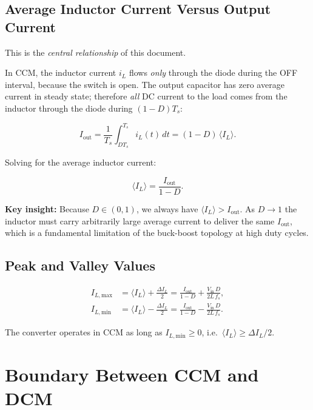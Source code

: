 \documentclass[12pt,a4paper]{article}
\newcommand{\Vin}{V_{\mathrm{in}}}
\newcommand{\Iout}{I_{\mathrm{out}}}
\newcommand{\ILmax}{I_{L,\mathrm{max}}}
\newcommand{\ILmin}{I_{L,\mathrm{min}}}
\newcommand{\ILavg}{\langle I_L \rangle}
\newcommand{\DeltaIL}{\Delta I_L}
\newcommand{\Ts}{T_s}
\newcommand{\fs}{f_s}
\begin{document}
\subsection{Average Inductor Current Versus Output Current}

This is the \emph{central relationship} of this document.

In CCM, the inductor current $i_L$ flows \emph{only} through the diode
during the OFF interval, because the switch is open.
The output capacitor has zero average current in steady state; therefore
\emph{all} DC current to the load comes from the inductor through the
diode during $(1-D)\Ts$:

\begin{equation}
  \Iout
  = \frac{1}{\Ts}\int_{D\Ts}^{\Ts} i_L(t)\,dt
  = (1-D)\,\ILavg.
  \label{eq:Iout_def}
\end{equation}

Solving for the average inductor current:

\begin{equation}
  \boxed{\ILavg = \frac{\Iout}{1-D}.}
  \label{eq:ILavg_CCM}
\end{equation}

\textbf{Key insight:} Because $D \in (0,1)$, we always have
$\ILavg > \Iout$.  As $D \to 1$ the inductor must carry arbitrarily large
average current to deliver the same $\Iout$, which is a fundamental
limitation of the buck-boost topology at high duty cycles.

\subsection{Peak and Valley Values}

\begin{align}
  \ILmax &= \ILavg + \frac{\DeltaIL}{2}
          = \frac{\Iout}{1-D} + \frac{\Vin\,D}{2L\,\fs},
  \label{eq:ILmax}\\[4pt]
  \ILmin &= \ILavg - \frac{\DeltaIL}{2}
          = \frac{\Iout}{1-D} - \frac{\Vin\,D}{2L\,\fs}.
  \label{eq:ILmin}
\end{align}

The converter operates in CCM as long as $\ILmin \ge 0$, i.e.\
$\ILavg \ge \DeltaIL/2$.

\section{Boundary Between CCM and DCM}
\label{sec:boundary}
\end{document}
